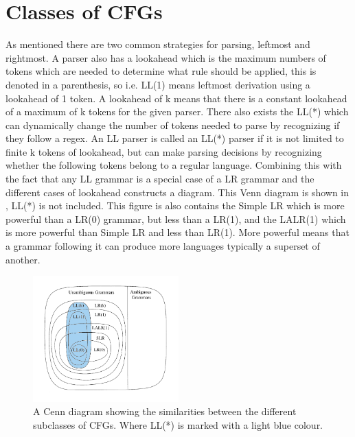 \section{Classes of CFGs}
As mentioned there are two common strategies for parsing, leftmost and rightmost. 
A parser also has a lookahead which is the maximum numbers of tokens which are needed to determine what rule should be applied, this is denoted in a parenthesis, so i.e. LL(1) means leftmost derivation using a lookahead of 1 token. 
A lookahead of k means that there is a constant lookahead of a maximum of k tokens for the given parser. 
There also exists the LL(*) which can dynamically change the number of tokens needed to parse by recognizing if they follow a \acrshort{regex}.
An LL parser is called an LL(*) parser if it is not limited to finite k tokens of lookahead, but can make parsing decisions by recognizing whether the following tokens belong to a regular language.
Combining this with the fact that any LL grammar is a special case of a LR grammar and the different cases of lookahead constructs a diagram. 
This Venn diagram is shown in , LL(*) is not included.
This figure is also contains the Simple LR which is more powerful than a LR(0) grammar, but less than a LR(1), and the LALR(1) which is more powerful than Simple LR and less than LR(1).
More powerful means that a grammar following it can produce more languages typically a superset of another. 
\begin{figure}[!ht]
\centering
 \includegraphics[width=0.5\textwidth]{figures/classesofgrammars.png} %
\caption{A Cenn diagram showing the similarities between the different subclasses of CFGs. Where LL(*) is marked with a light blue colour. \citep{Lecture5}}
\label{fig:hierarchyofgrammars}
\vspace{-15pt}
\end{figure}
